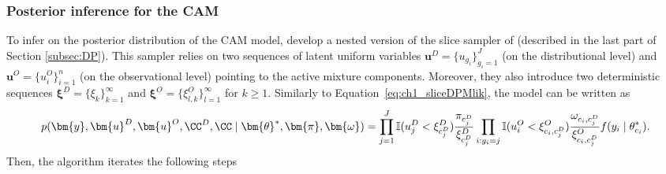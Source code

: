 \subsubsection*{Posterior inference for the CAM}
To infer on the posterior distribution of the CAM model, \citet{denti2021} develop a nested version of the slice sampler of \citet{kalli2011} (described in the last part of Section \ref{subsec:DP}). This sampler relies on two sequences of latent uniform variables $\bm{u}^D = \{u_{g_i}\}_{g_i=1}^J$ (on the distributional level) and $\bm{u}^O = \{u^O_i\}_{i=1}^n$ (on the observational level) pointing to the active mixture components. Moreover, they also introduce two deterministic sequences $\bm{\xi}^D = \{\xi_k\}_{k=1}^{\infty}$ and $\bm{\xi}^O = \{\xi_{l,k}^O\}_{l=1}^{\infty}$ for $k\geq 1$.
Similarly to Equation~\ref{eq:ch1_sliceDPMlik}, the model can be written as 
\begin{equation*}
p(\bm{y}, \bm{u}^D, \bm{u}^O, \CC^D, \CC \mid \bm{\theta}^*, \bm{\pi}, \bm{\omega} ) = \prod_{j=1}^J \mathbb{I}(u^D_j < \xi^D_{c^D_j}) \frac{\pi_{c^D_j}}{\xi^D_{c^D_{j}}}  \prod_{i:g_i=j} \mathbb{I}(u_i^O < \xi_{c_i,c^D_j}^O) 
\frac{\omega_{c_i,c^D_j}}{\xi_{c_i,c^D_j}^O}
f(y_i\mid\theta^*_{c_i}).
\end{equation*}
Then, the algorithm iterates the following steps
